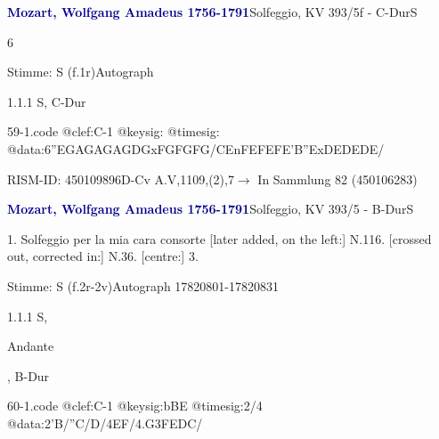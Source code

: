 \documentclass[a4paper, twocolumn, 11pt]{book}
\begin{document}
\par \vspace{16pt} \textcolor{darkblue}{\textbf{Mozart, Wolfgang Amadeus  1756-1791}}\hfillplus{[59]}\newline Solfeggio, KV 393/5f - C-Dur\newline S
\par \begin{itshape} 6\end{itshape} 
\par \textcolor{darkblue}{}  Stimme: S  (f.1r)\newline Autograph
\par 1.1.1  S, C-Dur  
\begin{filecontents*}{59-1.code}
@clef:C-1
@keysig:
@timesig:
@data:6''{EGAG}{AGAG}{DGxFG}{FGFG}/{CEnFE}{FEFE}{'B''ExDE}{DEDE}/
\end{filecontents*}

\newline %
\par RISM-ID: 450109896\newline D-Cv  A.V,1109,(2),7\newline $\rightarrow$ In Sammlung 82 (450106283)
      
\par \vspace{16pt} \textcolor{darkblue}{\textbf{Mozart, Wolfgang Amadeus  1756-1791}}\hfillplus{[60]}\newline Solfeggio, KV 393/5 - B-Dur\newline S
\par \begin{itshape} 1. Solfeggio per la mia cara consorte [later added, on the left:] N.116. [crossed out, corrected in:] N.36.  [centre:] 3.\end{itshape} 
\par \textcolor{darkblue}{}  Stimme: S  (f.2r-2v)\newline Autograph  17820801-17820831
\par 1.1.1  S, \begin{itshape}Andante\end{itshape}, B-Dur  
\begin{filecontents*}{60-1.code}
@clef:C-1
@keysig:bBE
@timesig:2/4
@data:2'B/''C/D/4EF/4.G{3FEDC}/
\end{filecontents*}
\end{document}

